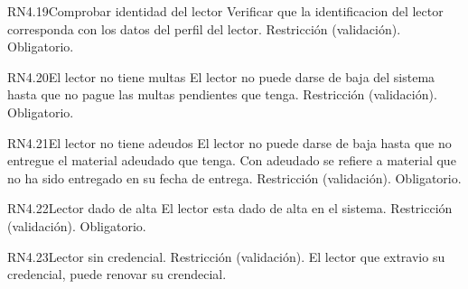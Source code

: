 
\begin{BussinesRule}{RN4.19}{Comprobar identidad del lector } 
	\BRitem[Descripción:] Verificar que la identificacion del lector corresponda con los datos del perfil del lector.
	\BRitem[Tipo:] Restricción (validación).
	\BRitem[Nivel:] Obligatorio.
\end{BussinesRule}


\begin{BussinesRule}{RN4.20}{El lector no tiene multas} 
	\BRitem[Descripción:] El lector no puede darse de baja del sistema hasta que no pague las multas pendientes que tenga.
	\BRitem[Tipo:] Restricción (validación).
	\BRitem[Nivel:] Obligatorio.
\end{BussinesRule}


\begin{BussinesRule}{RN4.21}{El lector no tiene adeudos} 
	\BRitem[Descripción:] El lector no puede darse de baja hasta que no entregue el material adeudado que tenga. Con adeudado se refiere a material que no ha sido entregado en su fecha de entrega.
	\BRitem[Tipo:] Restricción (validación).
	\BRitem[Nivel:] Obligatorio.
\end{BussinesRule}


\begin{BussinesRule}{RN4.22}{Lector dado de alta} 
	\BRitem[Descripción:] El lector esta dado de alta en el sistema.
	\BRitem[Tipo:] Restricción (validación).
	\BRitem[Nivel:] Obligatorio.
\end{BussinesRule}


\begin{BussinesRule}{RN4.23}{Lector sin credencial.}
	\BRitem[Tipo:] Restricción (validación).
	\BRitem[Descripción:] El lector que extravio su credencial, puede renovar su crendecial.
\end{BussinesRule}


